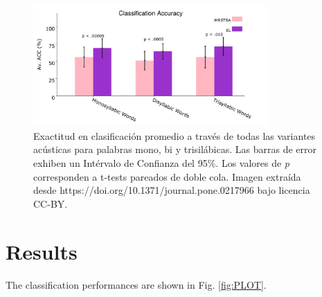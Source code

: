 {\begin{figure}[h!]
    \centering
    \includegraphics[width=0.8\textwidth]{PLOT1.png}
    \caption{Exactitud en clasificación promedio a través de todas las variantes acústicas para palabras mono, bi y trisilábicas. Las barras de error exhiben un Intérvalo de Confianza del 95\%. Los valores de \emph{p} corresponden a t-tests pareados de doble cola.
    Imagen extraída desde https://doi.org/10.1371/journal.pone.0217966 bajo licencia CC-BY.}
    \label{fig:PLOT1}
\end{figure}
}{
\section{Results}

The classification performances are shown in Fig. \ref{fig:PLOT}.

}

